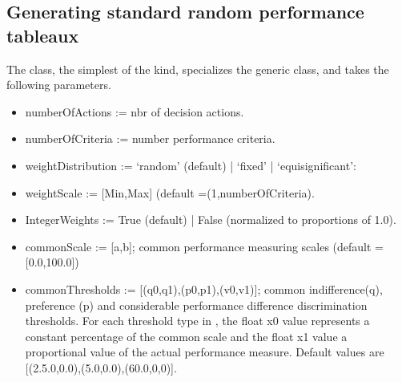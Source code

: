 \documentclass[a4paper,10pt,english]{sphinxhowto}
\begin{document}
\subsection{Generating standard random performance tableaux}
\label{\detokenize{tutorial:generating-standard-random-performance-tableaux}}
The  class, the simplest of the kind, specializes the generic  class, and takes the following parameters.
\begin{itemize}
\item {} 
numberOfActions := nbr of decision actions.

\item {} 
numberOfCriteria := number performance criteria.

\item {} 
weightDistribution := ‘random’ (default) | ‘fixed’ | ‘equisignificant’:
\begin{quote}

\end{quote}

\item {} 
weightScale := {[}Min,Max{]} (default =(1,numberOfCriteria).

\item {} 
IntegerWeights := True (default) | False (normalized to proportions of 1.0).

\item {} 
commonScale := {[}a,b{]}; common performance measuring scales (default = {[}0.0,100.0{]})

\item {} 
commonThresholds := {[}(q0,q1),(p0,p1),(v0,v1){]}; common indifference(q), preference (p) and considerable performance difference discrimination thresholds. For each threshold type  in , the float x0 value represents a constant percentage of the common scale and the float x1 value a proportional value of the actual performance measure. Default values are {[}(2.5.0,0.0),(5.0,0.0),(60.0,0,0){]}.


\end{itemize}
\end{document}
